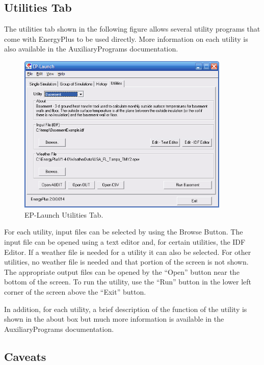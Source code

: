\subsection{Utilities Tab}\label{utilities-tab}

The utilities tab shown in the following figure allows several utility programs that come with EnergyPlus to be used directly. More information on each utility is also available in the AuxiliaryPrograms documentation.

\begin{figure}[hbtp] %
\centering
\includegraphics[width=0.9\textwidth, height=0.9\textheight, keepaspectratio=true]{media/image009.png}
\caption{EP-Launch Utilities Tab. \protect \label{fig:ep-launch-utilities-tab.}}
\end{figure}

For each utility, input files can be selected by using the Browse Button. The input file can be opened using a text editor and, for certain utilities, the IDF Editor. If a weather file is needed for a utility it can also be selected. For other utilities, no weather file is needed and that portion of the screen is not shown. The appropriate output files can be opened by the ``Open'' button near the bottom of the screen. To run the utility, use the ``Run'' button in the lower left corner of the screen above the ``Exit'' button.

In addition, for each utility, a brief description of the function of the utility is shown in the about box but much more information is available in the AuxiliaryPrograms documentation.

\subsection{Caveats}\label{caveats}

